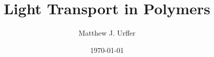 \documentclass[]{report}
\title{Light Transport in Polymers}
\author{Matthew J. Urffer}
\date{\today}
\begin{document}
\maketitle

\listoftodos




\end{document}

